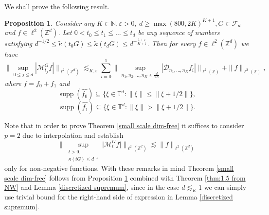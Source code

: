 \documentclass[a4paper,oneside, reqno]{amsart}
\numberwithin{equation}{section}
\newtheorem{Prop}[Thm]{Proposition}
\theoremstyle{definition}%
\theoremstyle{definition}
\theoremstyle{definition}%
\theoremstyle{definition}
\newcommand{\Z}{\mathbb{Z}}
\newcommand{\N}{\mathbb{N}}
\newcommand{\T}{\mathbb{T}}
\DeclareMathOperator{\supp}{supp}
\begin{document}
We shall prove the following result.
\begin{Prop} \label{prop MG bounded by D}
    Consider any $K \in \N, \varepsilon>0$, $d \ge \max(800,2K)^{K+1}, G \in \mathcal{F}_d$ and $f \in \ell^2(\Z^d)$. Let $0<t_0 \le t_1 \le \ldots \le t_d$ be any sequence of numbers
    satisfying $d^{-1/2} \le \widetilde{\kappa}(t_0G) \le \widetilde{\kappa}(t_dG) \le d^{- \frac{1+\varepsilon}{K+1}}$.
    Then for every $f \in \ell^2(\Z^d)$ we have
   \[
   \Big\|\sup_{0 \le j \le d} |\mathcal{M}_{t_j}^Gf| \Big\|_{\ell^2(\Z^d)} \lesssim_{K,\varepsilon} \sum_{i=0}^1 \Big\| \sup_{n_1,n_2,...,n_K \leq \frac{d}{2K}} |\mathcal{D}_{n_1,...,n_K}f_i| \Big\|_{\ell^2(\Z)} + \|f\|_{\ell^2(\Z)},
   \]
   where $f=f_0+f_1$ and
\[
\supp(\widehat{f_0}) \subseteq \{\xi \in \T^d: \|\xi \| \leq \| \xi + 1/2 \| \},
\]
\[
\supp(\widehat{f_1}) \subseteq \{\xi \in \T^d: \|\xi \| > \| \xi + 1/2 \| \}.
\]
\end{Prop}
Note that in order to prove Theorem \ref{small scale dim-free} it suffices to consider $p=2$ due to interpolation and establish
\[
\bigg\|\sup_{\substack{t>0, \\
 \widetilde{\kappa}(tG) \le d^{-\varepsilon}}} \big|\mathcal{M}_{t}^G f\big| \bigg\|_{\ell^2(\Z^d)} \lesssim \|f \|_{\ell^2(\Z^d)}
\]
only for non-negative functions.
With these remarks in mind Theorem \ref{small scale dim-free} follows from Proposition \ref{prop MG bounded by D} combined with Theorem \ref{thm:1.5 from NW} and Lemma \ref{discretized supremum}, since in the case $d \lesssim_K 1$ we can simply use trivial bound for the right-hand side of expression in Lemma \ref{discretized supremum}. 
\end{document}
